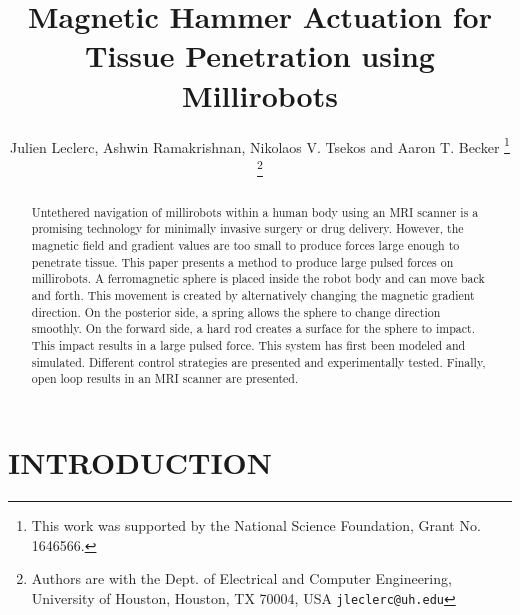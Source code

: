 \documentclass[letterpaper, 10 pt, conference]{ieeeconf}  %
\title{\LARGE \bf
Magnetic Hammer Actuation for Tissue Penetration using Millirobots
}
\author{Julien Leclerc, Ashwin Ramakrishnan, Nikolaos V. Tsekos and Aaron T. Becker %
\thanks{This work was supported by the National Science Foundation, Grant No. 1646566. }%
\thanks{Authors are with the Dept. of Electrical and Computer
Engineering, University of Houston, Houston, TX 70004, USA
        {\tt\small jleclerc@uh.edu}}%
}
\begin{document}
\maketitle
\thispagestyle{empty}
\pagestyle{empty}


\begin{abstract}

Untethered navigation of millirobots within a human body using an MRI scanner is a promising technology for minimally invasive surgery or drug delivery. However, the magnetic field and gradient values are too small to produce forces large enough to penetrate tissue. This paper presents a method to produce large pulsed forces on millirobots. A ferromagnetic sphere is placed inside the robot body and can move back and forth. This movement is created by alternatively changing the magnetic gradient direction. On the posterior side, a spring allows the sphere to change direction smoothly. On the forward side, a hard rod creates a surface for the sphere to impact. This impact results in a large pulsed force. This system has first been modeled and simulated. Different control strategies are presented and experimentally tested. Finally, open loop results in an MRI scanner are presented.

\end{abstract}


\section{INTRODUCTION}
\end{document}

